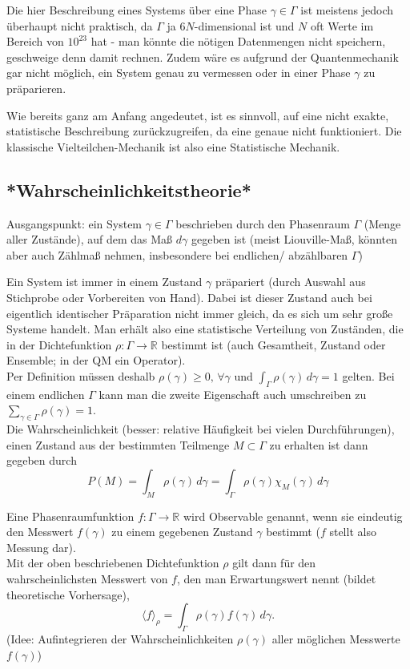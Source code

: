 \documentclass[../KlassMech_main.tex]{subfiles}
\begin{document}
Die hier Beschreibung eines Systems über eine Phase $\gamma \in \Gamma$ ist meistens jedoch überhaupt nicht praktisch, da $\Gamma$ ja $6N$-dimensional ist und $N$ oft Werte im Bereich von $10^{23}$ hat - man könnte die nötigen Datenmengen nicht speichern, geschweige denn damit rechnen. Zudem wäre es aufgrund der Quantenmechanik gar nicht möglich, ein System genau zu vermessen oder in einer Phase $\gamma$ zu präparieren.

Wie bereits ganz am Anfang angedeutet, ist es sinnvoll, auf eine nicht exakte, statistische Beschreibung zurückzugreifen, da eine genaue nicht funktioniert. Die klassische Vielteilchen-Mechanik ist also eine Statistische Mechanik.



	\subsection{*Wahrscheinlichkeitstheorie*}
Ausgangspunkt: ein System $\gamma \in \Gamma$ beschrieben durch den Phasenraum $\Gamma$ (Menge aller Zustände), auf dem das Maß $d\gamma$ gegeben ist (meist Liouville-Maß, könnten aber auch Zählmaß nehmen, insbesondere bei endlichen/ abzählbaren $\Gamma$)

Ein System ist immer in einem Zustand $\gamma$ präpariert (durch Auswahl aus Stichprobe oder Vorbereiten von Hand). Dabei ist dieser Zustand auch bei eigentlich identischer Präparation nicht immer gleich, da es sich um sehr große Systeme handelt. Man erhält also eine statistische Verteilung von Zuständen, die in der Dichtefunktion $\rho: \Gamma \rightarrow \mathbb{R}$ bestimmt ist (auch Gesamtheit, Zustand oder Ensemble; in der QM ein Operator).\\
Per Definition müssen deshalb $\rho(\gamma) \geq 0, \, \forall \gamma$ und $\int_\Gamma \rho(\gamma) \, d\gamma = 1$ gelten. Bei einem endlichen $\Gamma$ kann man die zweite Eigenschaft auch umschreiben zu $\sum\limits_{\gamma \in \Gamma} \rho(\gamma) = 1$.\\
Die Wahrscheinlichkeit (besser: relative Häufigkeit bei vielen Durchführungen), einen Zustand aus der bestimmten Teilmenge $M \subset \Gamma$ zu erhalten ist dann gegeben durch
\begin{equation}\label{key}
P(M) = \int_M \rho(\gamma) \, d\gamma = \int_\Gamma \rho(\gamma)\chi_M(\gamma) \, d\gamma
\end{equation}

Eine Phasenraumfunktion $f: \Gamma \rightarrow \mathbb{R}$ wird Observable genannt, wenn sie eindeutig den Messwert $f(\gamma)$ zu einem gegebenen Zustand $\gamma$ bestimmt ($f$ stellt also Messung dar).\\
Mit der oben beschriebenen Dichtefunktion $\rho$ gilt dann für den wahrscheinlichsten Messwert von $f$, den man Erwartungswert nennt (bildet theoretische Vorhersage),
\begin{equation}\label{key}
\langle f \rangle_\rho = \int_\Gamma \rho(\gamma) f(\gamma) \, d\gamma .
\end{equation}
(Idee: Aufintegrieren der Wahrscheinlichkeiten $\rho(\gamma)$ aller möglichen Messwerte $f(\gamma)$)
\end{document}

